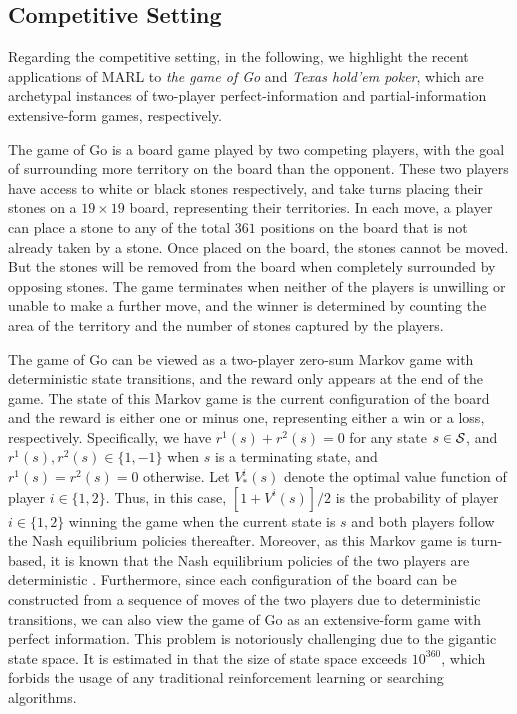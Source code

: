 \subsection{Competitive Setting} \label{sec:application_comp}

Regarding the competitive setting, in the following, we highlight the recent applications of MARL to \emph{the game of Go} and \emph{Texas hold'em  poker}, which are  archetypal instances of two-player perfect-information and partial-information extensive-form games, respectively.

\vspace{6pt}
\vspace{3pt} 


The game of Go is a board game played by two competing players, with the goal  of  surrounding more territory on the board than the opponent.  These two players have access to white or black stones respectively, and take turns placing their stones on a $19\times 19$ board, representing their territories. In each move, a player  can place a stone to any of the total $361$ positions on the board that is not already taken by a stone. Once placed on the board, the stones cannot be moved. But the stones will be removed from the board when completely surrounded by opposing stones. The game terminates when neither of the players is unwilling or unable to make a further move, and the winner is determined by counting the  area of the territory and the number of stones captured by the players.  

The game of Go can be viewed as a two-player zero-sum Markov game with deterministic state transitions, and the reward  only appears at the end of the game.  The state of this Markov game is the current configuration of the board and the reward is either one or minus one, representing either a win or a loss, respectively. Specifically,  we have $  r^1 (s)+ r^2(s)   =   0$ for any state $s\in {\mathcal{S}}$, and   $r^1(s), r^2 (s) \in \{1, -1\}$ when $s$ is a terminating state, and $r^1 (s) = r^2 (s) = 0$ otherwise.  Let $V_{*}^i(s)$ denote the optimal value function of player $i \in \{1,2\}$.  Thus, in this case,  $[ 1+ V^{i}(s)]/2$ is  the probability of player $i\in \{1,2\}$  winning  the game when the current state is $s$ and both players follow the Nash equilibrium policies thereafter.  Moreover,
as this Markov game is turn-based, it is known that the Nash equilibrium policies of the two players are deterministic \cite{hansen2013strategy}. 
Furthermore,  since each configuration of the board can be constructed from a sequence of moves of the two players due to deterministic transitions, we can also view the game of Go as an extensive-form game with perfect information. 
This problem is notoriously challenging due to the gigantic state space. It is estimated in 
 \cite{allis1994searching}  that the size of state space  exceeds $10^{360}$, which forbids the usage of  any traditional reinforcement learning or searching algorithms.
 
